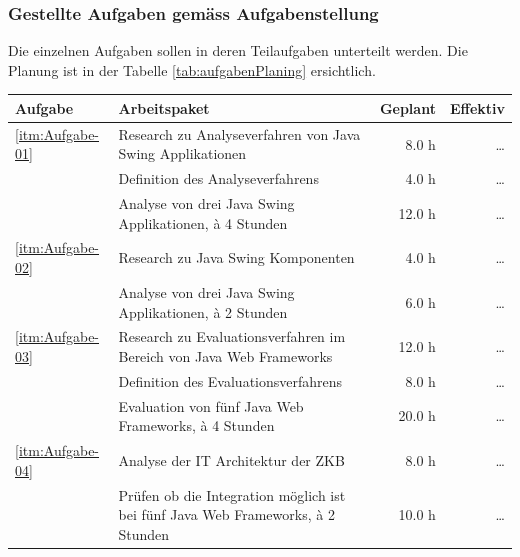   \newpage
  
  \subsubsection{Gestellte Aufgaben gemäss Aufgabenstellung}
  
  Die einzelnen Aufgaben sollen in deren Teilaufgaben unterteilt werden. Die
  Planung ist in der Tabelle \ref{tab:aufgabenPlaning} ersichtlich.
  \newline
  
  \begin{table}[!h]
    \begin{center}
      \begin{tabular}{lp{7cm}rr}
        \toprule
        Aufgabe & Arbeitspaket & Geplant & Effektiv \\

        \midrule
        \ref{itm:Aufgabe-01} &
        Research zu Analyseverfahren von Java Swing Applikationen &
        8.0 h &
        \ldots\\
        &
        Definition des Analyseverfahrens &
        4.0 h &
        \ldots\\
        &
        Analyse von drei Java Swing Applikationen, à 4 Stunden &
        12.0 h &
        \ldots\\

        \midrule
        \ref{itm:Aufgabe-02} &
        Research zu Java Swing Komponenten &
        4.0 h &
        \ldots\\
        &
        Analyse von drei Java Swing Applikationen, à 2 Stunden &
        6.0 h &
        \ldots\\

        \midrule
        \ref{itm:Aufgabe-03} &
        Research zu Evaluationsverfahren im Bereich von Java Web Frameworks &
        12.0 h &
        \ldots\\
        &
        Definition des Evaluationsverfahrens &
        8.0 h &
        \ldots\\
        &
        Evaluation von fünf Java Web Frameworks, à 4 Stunden &
        20.0 h &
        \ldots\\

        \midrule
        \ref{itm:Aufgabe-04} &
        Analyse der IT Architektur der ZKB &
        8.0 h &
        \ldots\\
        &
        Prüfen ob die Integration möglich ist bei fünf Java Web Frameworks, à 2
        Stunden &
        10.0 h &
        \ldots\\
        

\end{tabular}
\end{center}
\end{table}
